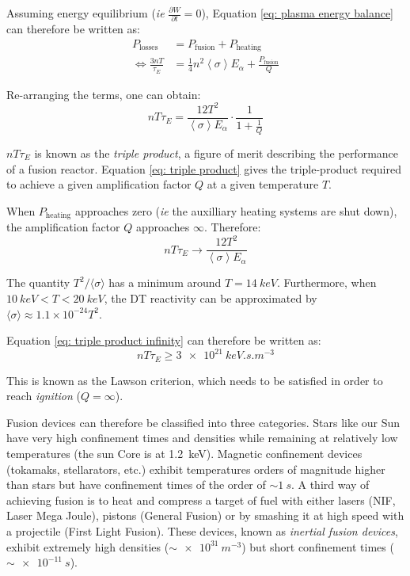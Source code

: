 Assuming energy equilibrium (\textit{ie} $\frac{\partial W}{\partial t} = 0$), Equation \ref{eq: plasma energy balance} can therefore be written as:
\begin{align}
    P_\mathrm{losses} &= P_\mathrm{fusion} + P_\mathrm{heating} \\
    \Leftrightarrow \frac{3 n T}{\tau_E} &= \frac{1}{4} n^2 \left\langle \sigma \right\rangle E_\alpha + \frac{P_\mathrm{fusion}}{Q}
\end{align}

Re-arranging the terms, one can obtain:
\begin{equation}
    n T \tau_E = \frac{12 T^2}{\left\langle \sigma \right\rangle E_\alpha} \cdot \frac{1}{1 + \frac{1}{Q}}
    \label{eq: triple product}
\end{equation}

$n T \tau_E$ is known as the \textit{triple product}, a figure of merit describing the performance of a fusion reactor.
Equation \ref{eq: triple product} gives the triple-product required to achieve a given amplification factor $Q$ at a given temperature $T$.

When $P_\mathrm{heating}$ approaches zero (\textit{ie} the auxilliary heating systems are shut down), the amplification factor $Q$ approaches $\infty$.
Therefore:
\begin{equation}
    n T \tau_E \rightarrow \frac{12 T^2}{\left\langle \sigma \right\rangle E_\alpha}
    \label{eq: triple product infinity}
\end{equation}

The quantity $T^2/\langle \sigma \rangle$ has a minimum around $T=\SI{14}{keV}$.
Furthermore, when $\SI{10}{keV} < T < \SI{20}{keV}$, the DT reactivity can be approximated by $\langle \sigma \rangle \approx 1.1 \times 10^{-24} T^2$.

Equation \ref{eq: triple product infinity} can therefore be written as:
\begin{equation}
    n T \tau_E \geq \SI{3e21}{keV.s.m^{-3}}
\end{equation}

This is known as the Lawson criterion, which needs to be satisfied in order to reach \textit{ignition} ($Q = \infty$).


Fusion devices can therefore be classified into three categories.
Stars like our Sun have very high confinement times and densities while remaining at relatively low temperatures (the sun Core is at \SI{1.2}{keV}).
Magnetic confinement devices (tokamaks, stellarators, etc.) exhibit temperatures orders of magnitude higher than stars but have confinement times of the order of $\sim \SI{1}{s}$.
A third way of achieving fusion is to heat and compress a target of fuel with either lasers (NIF, Laser Mega Joule), pistons (General Fusion) or by smashing it at high speed with a projectile (First Light Fusion).
These devices, known as \textit{inertial fusion devices}, exhibit extremely high densities ($\sim \SI{e31}{m^{-3}}$) but short confinement times ($\sim \SI{e-11}{s}$).
 
